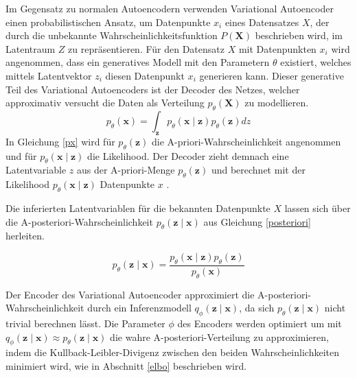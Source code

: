 Im Gegensatz zu normalen Autoencodern verwenden Variational Autoencoder einen probabilistischen Ansatz, um Datenpunkte $x_i$ eines Datensatzes $X$, der durch die unbekannte Wahrscheinlichkeitsfunktion $P(\mathbf{X})$ beschrieben wird, im Latentraum $Z$ zu repräsentieren. 
Für den Datensatz $X$ mit Datenpunkten $x_i$ wird angenommen, dass ein generatives Modell mit den Parametern $\theta$ existiert, welches mittels Latentvektor $z_i$ diesen Datenpunkt $x_i$ generieren kann.
Dieser generative Teil des Variational Autoencoders ist der Decoder des  Netzes, welcher approximativ versucht die Daten als Verteilung $p_\theta (\mathbf{X})$ zu modellieren.
\begin{equation}
    \label{px}
p_\theta (\mathbf{x}) = \int_{\mathbf{z}} p_\theta (\mathbf{x\mid z}) p_\theta (\mathbf{z}) dz
\end{equation}
In Gleichung \ref{px} wird für $p_\theta (\mathbf{z})$ die A-priori-Wahrscheinlichkeit angenommen und für $p_\theta (\mathbf{x\mid z})$ die Likelihood. Der Decoder zieht demnach eine Latentvariable $z$ aus der A-priori-Menge $p_\theta (\mathbf{z})$ und berechnet mit der Likelihood $p_\theta (\mathbf{x\mid z})$ Datenpunkte $x$ \citep{vae2}.

Die inferierten Latentvariablen für die bekannten Datenpunkte $X$ lassen sich über die A-posteriori-Wahrscheinlichkeit $p_\theta (\mathbf{z\mid x})$ aus Gleichung \ref{posteriori} herleiten. 

\begin{equation}
    \label{posteriori}
    p_\theta (\mathbf{z\mid x}) = \frac{p_\theta (\mathbf{x\mid z}) p_\theta (\mathbf{z})}{p_\theta(\mathbf{x})}
\end{equation}

Der Encoder des Variational Autoencoder approximiert die A-posteriori-Wahrscheinlichkeit durch ein Inferenzmodell $q_\phi (\mathbf{z\mid x})$, da sich $p_\theta (\mathbf{z\mid x})$ nicht trivial berechnen lässt.
Die Parameter $\phi$ des Encoders werden optimiert um mit $q_\phi (\mathbf{z\mid x}) \approx p_\theta (\mathbf{z\mid x})$ die wahre A-posteriori-Verteilung zu approximieren, indem die Kullback-Leibler-Divigenz zwischen den beiden Wahrscheinlichkeiten minimiert wird, wie in Abschnitt \ref{elbo} beschrieben wird.







